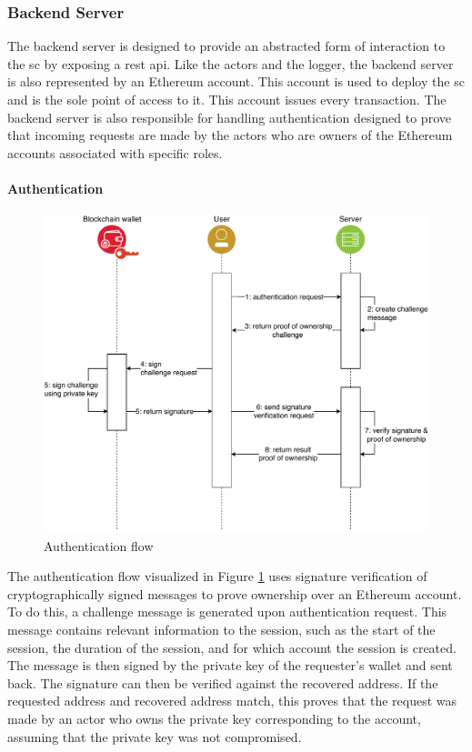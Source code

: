 \subsubsection{Backend Server}
The backend server is designed to provide an abstracted form of interaction to the \gls{sc} by exposing a \gls{rest} \gls{api}. Like the actors and the logger, the backend server is also represented by an Ethereum account. This account is used to deploy the \gls{sc} and is the sole point of access to it. This account issues every transaction. The backend server is also responsible for handling authentication designed to prove that incoming requests are made by the actors who are owners of the Ethereum accounts associated with specific roles.

\paragraph{Authentication}
\label{sec:authentication}

\begin{figure}[h]
    \centering
    \includegraphics[width=\textwidth, keepaspectratio]{diagrams/authentication_flow.drawio.pdf}
    \caption{Authentication flow}
    \label{fig:auth_flow}
\end{figure}

The authentication flow visualized in Figure \ref{fig:auth_flow} uses signature verification of cryptographically signed messages to prove ownership over an Ethereum account. To do this, a challenge message is generated upon authentication request. This message contains relevant information to the session, such as the start of the session, the duration of the session, and for which account the session is created. The message is then signed by the private key of the requester's wallet and sent back. The signature can then be verified against the recovered address. If the requested address and recovered address match, this proves that the request was made by an actor who owns the private key corresponding to the account, assuming that the private key was not compromised.

